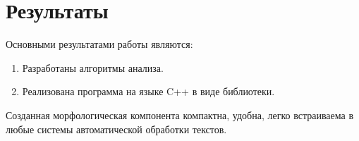 \chapter{Результаты} \label{chapt5}

Основными результатами работы являются:
\begin{enumerate}
  \item Разработаны алгоритмы анализа.
  \item Реализована программа на языке C++ в виде библиотеки.
\end{enumerate}

Созданная морфологическая компонента компактна, удобна, легко встраиваема в любые системы автоматической обработки текстов. 

\clearpage